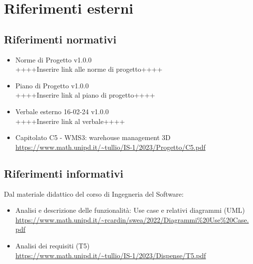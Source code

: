 \section{Riferimenti esterni}\label{sec:riferimenti}

\subsection{Riferimenti normativi}\label{sec:riferimenti_normativi}
\begin{itemize}
    \item Norme di Progetto v1.0.0 \\
    ++++Inserire link alle norme di progetto++++
    \item Piano di Progetto v1.0.0 \\
    ++++Inserire link al piano di progetto++++
    \item Verbale esterno 16-02-24 v1.0.0 \\
    ++++Inserire link al verbale++++
    \item Capitolato C5 - WMS3: warehouse management 3D \\
    \url{https://www.math.unipd.it/~tullio/IS-1/2023/Progetto/C5.pdf}
\end{itemize}

\subsection{Riferimenti informativi}\label{sec:riferimenti_informativi}
Dal materiale didattico del corso di Ingegneria del Software:
\begin{itemize}
    \item Analisi e descrizione delle funzionalità: Use case e relativi diagrammi (UML) \\
    \url{https://www.math.unipd.it/~rcardin/swea/2022/Diagrammi%20Use%20Case.pdf}
    \item Analisi dei requisiti (T5) \\
    \url{https://www.math.unipd.it/~tullio/IS-1/2023/Dispense/T5.pdf}
\end{itemize}
